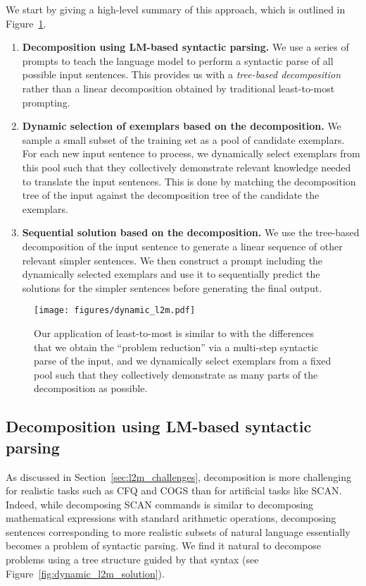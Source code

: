 \documentclass{article} \usepackage{iclr2022_conference,times}
\begin{document}
We start by giving a high-level summary of this approach, which is outlined in Figure~\ref{fig:dynamic_l2m}.

\begin{enumerate}
    \item \textbf{Decomposition using LM-based syntactic parsing.} We use a series of prompts to teach the language model to perform a syntactic parse of all possible input sentences. This provides us with a \textit{tree-based decomposition} rather than a linear decomposition obtained by traditional least-to-most prompting.
    
    \item \textbf{Dynamic selection of exemplars based on the decomposition.} We sample a small subset of the training set as a pool of candidate exemplars. For each new input sentence to process, we dynamically select exemplars from this pool such that they collectively demonstrate relevant knowledge needed to translate the input sentences. This is done by matching the decomposition tree of the input against the decomposition tree of the candidate the exemplars.
    
    \item \textbf{Sequential solution based on the decomposition.} 
    We use the tree-based decomposition of the input sentence to generate a linear sequence of other relevant simpler sentences.
    We then construct a prompt including the dynamically selected exemplars and use it to sequentially predict the solutions for the simpler sentences before generating the final output.
\end{enumerate}

\begin{figure}[t!]
    \centering
    \texttt{[image: figures/dynamic\_l2m.pdf]}
    \caption{Our application of least-to-most is similar to \cite{zhou2022leasttomost} with the differences that we obtain the ``problem reduction'' via a multi-step syntactic parse of the input, and we dynamically select exemplars from a fixed pool such that they collectively demonstrate as many parts of the decomposition as possible. }
    \label{fig:dynamic_l2m}
\end{figure}

\subsection{Decomposition using LM-based syntactic parsing}
\label{sec:decomposition}

As discussed in Section~\ref{sec:l2m_challenges}, decomposition is  more challenging for realistic tasks such as CFQ and COGS than for artificial tasks like SCAN. Indeed, while decomposing SCAN commands is similar to decomposing mathematical expressions with standard arithmetic operations, decomposing sentences corresponding to more realistic subsets of natural language essentially becomes a problem of syntactic parsing. We find it natural to decompose problems using a tree structure guided by that syntax (see Figure~\ref{fig:dynamic_l2m_solution}).
\end{document}
